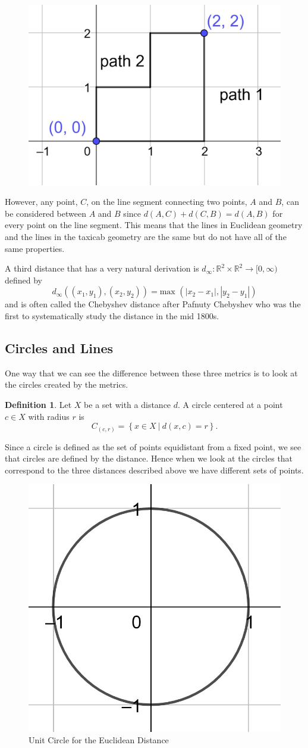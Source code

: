 \documentclass[
]{book}
\theoremstyle{definition}
\newtheorem{definition}{Definition}[chapter]
\theoremstyle{definition}
\theoremstyle{definition}
\theoremstyle{definition}
\theoremstyle{remark}
\begin{document}
\begin{figure}

{\centering \includegraphics[width=0.3\linewidth]{images/distance_multiple_paths} 

}

\end{figure}

However, any point, \(C\), on the line segment connecting two points, \(A\) and \(B\), can be considered between \(A\) and \(B\) since \(d(A,C)+d(C,B) = d(A,B)\) for every point on the line segment. This means that the lines in Euclidean geometry and the lines in the taxicab geometry are the same but do not have all of the same properties.

A third distance that has a very natural derivation is \(d_\infty: \mathbb{R}^2\times \mathbb{R}^2 \rightarrow [0,\infty)\) defined by \[d_\infty \left( (x_1,y_1), (x_2,y_2)\right) = \mbox{max } (|x_2-x_1|,|y_2-y_1|) \] and is often called the Chebyshev distance after Pafnuty Chebyshev who was the first to systematically study the distance in the mid 1800s.

\hypertarget{circles-and-lines}{%
\subsection{Circles and Lines}\label{circles-and-lines}}

One way that we can see the difference between these three metrics is to look at the circles created by the metrics.

\begin{definition}
Let \(X\) be a set with a distance \(d\). A circle centered at a point \(c\in X\) with radius \(r\) is
\[C_{(c,r)} = \left\{ x\in X \: \vert \: d(x,c)=r\right\}.\]
\end{definition}

Since a circle is defined as the set of points equidistant from a fixed point, we see that circles are defined by the distance. Hence when we look at the circles that correspond to the three distances described above we have different sets of points.

\begin{figure}

{\centering \includegraphics[width=0.3\linewidth]{images/circle-Euclidean} 

}

\caption{Unit Circle for the Euclidean Distance}\label{fig:Euclidean-circle}
\end{figure}
\end{document}
